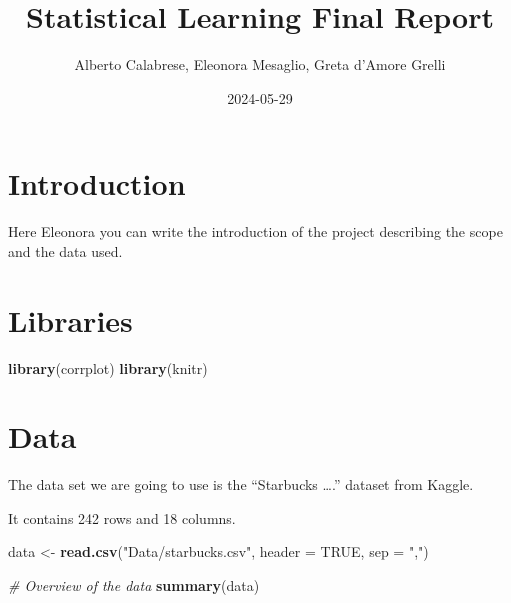 \documentclass[
]{article}
\title{Statistical Learning Final Report}
\author{Alberto Calabrese, Eleonora Mesaglio, Greta d'Amore Grelli}
\date{2024-05-29}
\newenvironment{Shaded}{\begin{snugshade}}{\end{snugshade}}
\newcommand{\AttributeTok}[1]{\textcolor[rgb]{0.13,0.29,0.53}{#1}}
\newcommand{\CommentTok}[1]{\textcolor[rgb]{0.56,0.35,0.01}{\textit{#1}}}
\newcommand{\ConstantTok}[1]{\textcolor[rgb]{0.56,0.35,0.01}{#1}}
\newcommand{\FunctionTok}[1]{\textcolor[rgb]{0.13,0.29,0.53}{\textbf{#1}}}
\newcommand{\NormalTok}[1]{#1}
\newcommand{\OtherTok}[1]{\textcolor[rgb]{0.56,0.35,0.01}{#1}}
\newcommand{\StringTok}[1]{\textcolor[rgb]{0.31,0.60,0.02}{#1}}
\begin{document}
\maketitle

{
\setcounter{tocdepth}{3}
\tableofcontents
}
\section{Introduction}\label{introduction}

Here Eleonora you can write the introduction of the project describing
the scope and the data used.

\section{Libraries}\label{libraries}

\begin{Shaded}
\begin{Highlighting}[]
\FunctionTok{library}\NormalTok{(corrplot)}
\FunctionTok{library}\NormalTok{(knitr)}
\end{Highlighting}
\end{Shaded}

\section{Data}\label{data}

The data set we are going to use is the ``Starbucks \ldots.'' dataset
from Kaggle.

It contains 242 rows and 18 columns.

\begin{Shaded}
\begin{Highlighting}[]
\NormalTok{data }\OtherTok{\textless{}{-}} \FunctionTok{read.csv}\NormalTok{(}\StringTok{"Data/starbucks.csv"}\NormalTok{, }\AttributeTok{header =} \ConstantTok{TRUE}\NormalTok{, }\AttributeTok{sep =} \StringTok{","}\NormalTok{)}

\CommentTok{\# Overview of the data}
\FunctionTok{summary}\NormalTok{(data)}
\end{Highlighting}
\end{Shaded}
\end{document}
